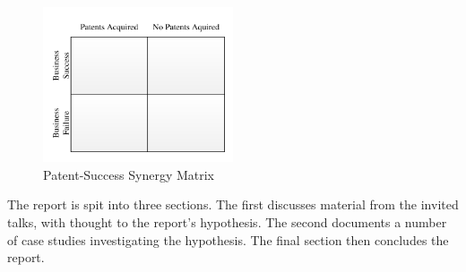 \begin{figure}
\centering
\includegraphics[width=0.5\textwidth]{./Figures/SuccessMatrix.pdf}
\caption{Patent-Success Synergy Matrix}
\label{fig:synergymatrix}
\end{figure}

The report is spit into three sections. 
The first discusses material from the invited talks, with thought to the report's hypothesis.
The second documents a number of case studies investigating the hypothesis.
The final section then concludes the report.
